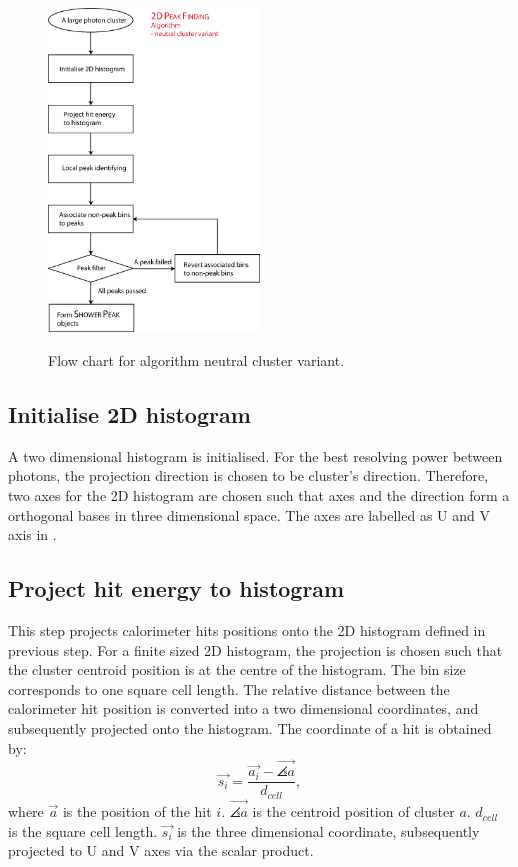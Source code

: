 \begin{figure}[tbph]
\centering
{\includegraphics[width=0.5\textwidth]{photon/2DpeakFinding}}
\caption[Flow chart for \peakFinding algorithm neutral cluster variant.]
{Flow chart for \peakFinding algorithm neutral cluster variant.}
\label{fig:photonPeakFindingFlowNeutral}
\end{figure}

\subsection{Initialise 2D histogram}

A two dimensional histogram is initialised. For the best resolving power between photons, the projection direction is chosen to be cluster's direction. Therefore, two axes for the 2D histogram are chosen such that axes and the direction form a orthogonal bases in three dimensional space. The axes are labelled as  U and V axis in .



\subsection{Project hit energy to histogram}

This step projects calorimeter hits positions onto the 2D histogram defined in previous step. For a finite sized 2D histogram, the projection is chosen such that the cluster centroid position is at the centre of the histogram. The bin size corresponds to one \ECAL square cell length. The relative distance between the calorimeter hit position is converted into a two dimensional coordinates, and subsequently projected onto the histogram. The coordinate of a hit is obtained by:
\begin{equation}
\vec{s_{i}} = \frac{\vec{a_{i}} -  \vec{\angles{a}}}{d_{cell}},
\end{equation}
where $\vec{a}$ is the position of the hit $i$.  $\vec{\angles{a}}$ is the centroid position of cluster $a$. $d_{cell}$ is the  \ECAL square cell length. $\vec{s_{i}}$ is the three dimensional coordinate, subsequently projected to U and V axes via the scalar product.

